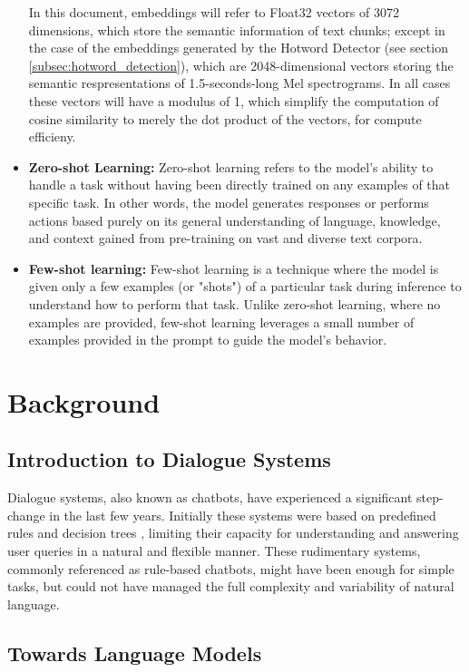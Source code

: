 \documentclass[a4paper,12pt,twoside]{ThesisStyle}
\begin{document}
\begin{itemize}
  In this document, embeddings will refer to Float32 vectors of 3072 dimensions, which store the semantic information of text chunks; except in the case of the embeddings generated by the Hotword Detector (see section \ref{subsec:hotword_detection}), which are 2048-dimensional vectors storing the semantic respresentations of 1.5-seconds-long Mel spectrograms. In all cases these vectors will have a modulus of 1, which simplify the computation of cosine similarity to merely the dot product of the vectors, for compute efficieny.
\item \textbf{Zero-shot Learning:} Zero-shot learning refers to the model's ability to handle a task without having been directly trained on any examples of that specific task. In other words, the model generates responses or performs actions based purely on its general understanding of language, knowledge, and context gained from pre-training on vast and diverse text corpora.
\item \textbf{Few-shot learning:} Few-shot learning is a technique where the model is given only a few examples (or "shots") of a particular task during inference to understand how to perform that task. Unlike zero-shot learning, where no examples are provided, few-shot learning leverages a small number of examples provided in the prompt to guide the model’s behavior.
\end{itemize}

\chapter{Background}
\label{cap:background}

\section{Introduction to Dialogue Systems}
\label{sec:chat}

Dialogue systems, also known as chatbots, have experienced a significant step-change in the last few years. Initially these systems were based on predefined rules and decision trees \cite{Weizenbaum1966ELIZA, AbuShawar2015ALICE}, limiting their capacity for understanding and answering user queries in a natural and flexible manner. These rudimentary systems, commonly referenced as rule-based chatbots, might have been enough for simple tasks, but could not have managed the full complexity and variability of natural language.

\section{Towards Language Models}
\label{sec:language}
\end{document}
